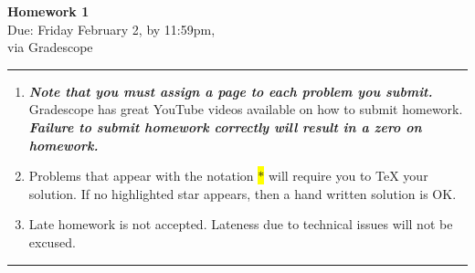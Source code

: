 \documentclass[12pt]{article}
\newif\ifshow
\begin{document}
\begin{center}
\ifshow
  \textbf{\Large Homework 1 Solution}\\
\else
  \textbf{\Large Homework 1}\\
\fi
Due: Friday February 2, by 11:59pm,\\via Gradescope\\
\end{center}

\hrule

\vspace{0.2cm}

\begin{enumerate}[$\bullet$]
\item  {\textbf{\textit{Note that you must assign a page to each problem you submit.}}}   Gradescope has great YouTube videos available on how to submit homework.  \textit{\textbf{Failure to submit homework correctly will result in a zero on homework.}}
\item Problems that appear with the notation \colorbox{yellow}{$\ast$} will require you to TeX your solution.  If no highlighted star appears, then a hand written solution is OK.  
\item Late homework is not accepted.  Lateness due to technical issues will not be excused.  
\end{enumerate}

\hrule

\vspace{0.5cm}
\end{document}
